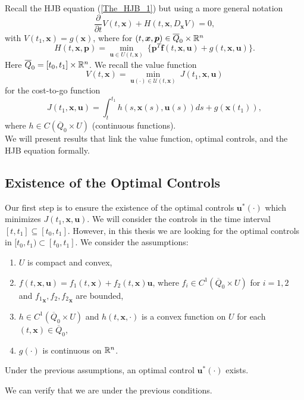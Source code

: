 Recall the HJB equation (\ref{The_HJB_1}) but using a more general notation
\begin{equation}
\frac{\partial}{\partial t}V(t,\bm{x})+H(t,\bm{x},D_{\bm{x}}V)=0,
\label{TheHJB}
\end{equation}
with $V(t_1,\bm{x})=g(\bm{x})$, where for $(t,\bm{x},\bm{p})\in\overline{Q}_0\times\mathbb{R}^n$
\begin{equation}
H(t,\bm{x},\bm{p})=\min_{\bm{u}\in U(t,\bm{x})}\ \{\bm{p}^T\bm{f}(t,\bm{x},\bm{u})+g(t,\bm{x},\bm{u})\}.
\end{equation}
Here $\overline{Q}_0=[t_0,t_1]\times \mathbb{R}^n$. We recall the value function
\begin{equation}
V(t,\bm{x})=\min_{\bm{u}(\cdot)\in\mathcal{U}(t,\bm{x})}\ J(t_1,\bm{x},\bm{u})
\label{VF}
\end{equation}
for the cost-to-go function
\begin{equation}
J(t_1,\bm{x},\bm{u})=\int_t^{t_1}h(s,\bm{x}(s),\bm{u}(s))ds+g(\bm{x}(t_1)),
\end{equation}
where $h\in C(\overline{Q}_0\times U)$ (continuous functions).\\
We will present results that link the value function, optimal controls, and the HJB equation formally.

\subsection{Existence of the Optimal Controls}

Our first step is to ensure the existence of the optimal controls $\bm{u}^*(\cdot)$ which minimizes $J(t_1,\bm{x},\bm{u})$. We will consider the controls in the time interval $[t,t_1]\subseteq[t_0,t_1]$. However, in this thesis we are looking for the optimal controls in $[t_0,t_1)\subset[t_0,t_1]$. We consider the assumptions:
\begin{enumerate}

\item $U$ is compact and convex,

\item $f(t,\bm{x},\bm{u})=f_1(t,\bm{x})+f_2(t,\bm{x})\bm{u}$, where $f_i\in C^1(\overline{Q}_0\times U)$ for $i=1,2$ and ${f_1}_{\bm{x}},f_2,{f_2}_{\bm{x}}$ are bounded,

\item $h\in C^1(\overline{Q}_0\times U)$ and $h(t,\bm{x},\cdot)$ is a convex function on $U$ for each $(t,\bm{x})\in\overline{Q}_0$,

\item $g(\cdot)$ is continuous on $\mathbb{R}^n$.

\end{enumerate}
\begin{theorem} \label{Existence_Theorem}
Under the previous assumptions, an optimal control $\bm{u}^*(\cdot)$ exists.
\end{theorem}
We can verify that we are under the previous conditions.

